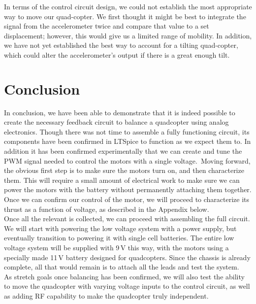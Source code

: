 \documentclass[11pt]{article} %
\begin{document}
In terms of the control circuit design, we could not establish the most appropriate way to move our quad-copter. We first thought it might be best to integrate the signal from the accelerometer twice and compare that value to a set displacement; however, this would give us a limited range of mobility. In addition, we have not yet established the best way to account for a tilting quad-copter, which could alter the accelerometer's output if there is a great enough tilt. 

\section{Conclusion}
In conclusion, we have been able to demonstrate that it is indeed possible to create the necessary feedback circuit to balance a quadcopter using analog electronics. Though there was not time to assemble a fully functioning circuit, its components have been confirmed in LTSpice to function as we expect them to. In addition it has been confirmed experimentally that we can create and tune the PWM signal needed to control the motors with a single voltage.\
Moving forward, the obvious first step is to make sure the motors turn on, and then characterize them. This will require a small amount of electrical work to make sure we can power the motors with the battery without permanently attaching them together. Once we can confirm our control of the motor, we will proceed to characterize its thrust as a function of voltage, as described in the Appendix below.\\
Once all the relevant is collected, we can proceed with assembling the full circuit. We will start with powering the low voltage system with a power supply, but eventually transition to powering it with single cell batteries. The entire low voltage system will be supplied with 9\,V this way, with the motors using a specially made 11\,V battery designed for quadcopters. Since the chassis is already complete, all that would remain is to attach all the leads and test the system.\\
As stretch goals once balancing has been confirmed, we will also test the ability to move the quadcopter with varying voltage inputs to the control circuit, as well as adding RF capability to make the quadcopter truly independent.
\newpage
\appendix
\end{document}
